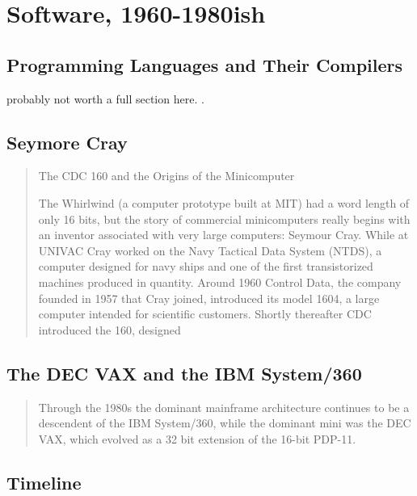 
\chapter{Software, 1960-1980ish}
\label{chap:software}






% 



\section{Programming Languages and Their Compilers}
probably not worth a full section here.
.

\section{Seymore Cray}
\begin{quotation}
	The CDC 160 and the Origins of the Minicomputer

	The Whirlwind (a computer prototype built at
	MIT) had a word length of only 16 bits, but the story of commercial minicomputers really begins with
	an inventor associated with very large computers: Seymour Cray. While at UNIVAC Cray worked on the
	Navy Tactical Data System (NTDS), a computer designed for navy ships and one of the first
	transistorized machines produced in quantity. Around 1960 Control Data, the company founded in 1957
	that Cray joined, introduced its model 1604, a large computer intended for scientific customers.
	Shortly thereafter CDC introduced the 160, designed
	\cite{nothing_new_since_von_neumann_2000}
\end{quotation}

\section{The DEC VAX and the IBM System/360}
\begin{quotation}
	Through the 1980s the dominant mainframe architecture continues to be a descendent of the IBM
	System/360, while the dominant mini was the DEC VAX, which evolved as a 32 bit extension of the
	16-bit PDP-11.
	\cite{nothing_new_since_von_neumann_2000}
\end{quotation}



\pagebreak
\section{Timeline}

